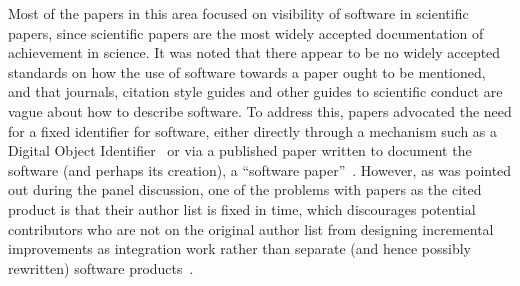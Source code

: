 \documentclass[11pt, oneside]{amsart}
\begin{document}
Most of the papers in this area focused on visibility of software in
scientific papers, since scientific papers are the most widely
accepted documentation of achievement in science. It was noted that
there appear to be no widely accepted standards on how the use of
software towards a paper ought to be mentioned, and that journals,
citation style guides and other guides to scientific conduct are vague
about how to describe software. To address this, papers advocated the
need for a fixed identifier for software, either directly through a
mechanism such as a Digital Object
Identifier~\cite{Katz_WSSSPE,Knepley_WSSSPE} or via a published paper
written to document the software (and perhaps its creation), a
``software paper''~\cite{Chue_Hong_WSSSPE}. However, as was pointed
out during the panel discussion, one of the problems with papers as
the cited product is that their author list is fixed in time, which
discourages potential contributors who are not on the original author
list from designing incremental improvements as integration work
rather than separate (and hence possibly rewritten) software
products~\cite{howison_incentives_2013}.
\end{document}
